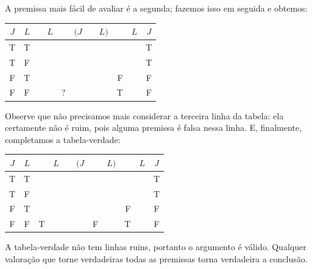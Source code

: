 A premissa mais fácil de avaliar é a segunda; fazemos isso em seguida e obtemos:
\begin{center}
	\begin{tabular}{c c|d e e e e f |d f|c}
		$J$&$L$&\enot&$L$&\eif&$(J$&\eor&$L)$&\enot&$L$&$J$\\
		\hline
		T & T & &&&&&&&& {T}\\
		T & F & &&&&&&&& {T}\\
		F & T & &&&&&&{F}&& {F}\\
		F & F & &&?&&&&{T}&& {F}
	\end{tabular}
\end{center}
Observe que não precisamos mais considerar a terceira linha da tabela: ela certamente não é ruim, pois alguma premissa é falsa nessa linha. E, finalmente, completamos a tabela-verdade:
\begin{center}
	\begin{tabular}{c c|d e e e e f |d f|c}
		$J$&$L$&\enot&$L$&\eif&$(J$&\eor&$L)$&\enot&$L$&$J$\\
		\hline
		T & T & &&&&&&&& {T}\\
		T & F & &&&&&&&& {T}\\
		F & T & &&&&&&{F}& & {F}\\
		F & F & T &  &  &  & F & & {T} & & {F}
	\end{tabular}
\end{center}
A tabela-verdade não tem linhas ruins, portanto o argumento é válido. Qualquer valoração que torne verdadeiras todas as premissas torna verdadeira a conclusão.

